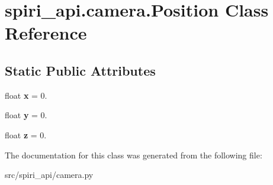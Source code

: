 \hypertarget{classspiri__api_1_1camera_1_1_position}{\section{spiri\-\_\-api.\-camera.\-Position \-Class \-Reference}
\label{classspiri__api_1_1camera_1_1_position}
}
\subsection*{\-Static \-Public \-Attributes}
\begin{DoxyCompactItemize}
\item 
\hypertarget{classspiri__api_1_1camera_1_1_position_ac6861d3956447e9d71b0cf1b14a02ae9}{float {\bfseries x} = 0.}\label{classspiri__api_1_1camera_1_1_position_ac6861d3956447e9d71b0cf1b14a02ae9}

\item 
\hypertarget{classspiri__api_1_1camera_1_1_position_a75df6e2ebc14a5913f4f719b6fcfcf78}{float {\bfseries y} = 0.}\label{classspiri__api_1_1camera_1_1_position_a75df6e2ebc14a5913f4f719b6fcfcf78}

\item 
\hypertarget{classspiri__api_1_1camera_1_1_position_a224ee1810fb5157c8b100ad6cf73b759}{float {\bfseries z} = 0.}\label{classspiri__api_1_1camera_1_1_position_a224ee1810fb5157c8b100ad6cf73b759}

\end{DoxyCompactItemize}


\-The documentation for this class was generated from the following file\-:\begin{DoxyCompactItemize}
\item 
src/spiri\-\_\-api/camera.\-py\end{DoxyCompactItemize}
